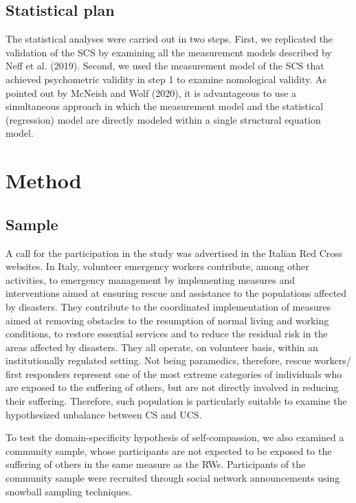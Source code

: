 \documentclass[
  man]{apa7}
\begin{document}
\hypertarget{statistical-plan}{%
\subsection{Statistical plan}\label{statistical-plan}}

The statistical analyses were carried out in two steps. First, we replicated the validation of the SCS by examining all the measurement models described by Neff et al. (2019). Second, we used the measurement model of the SCS that achieved psychometric validity in step 1 to examine nomological validity. As pointed out by McNeish and Wolf (2020), it is advantageous to use a simultaneous approach in which the measurement model and the statistical (regression) model are directly modeled within a single structural equation model.

\hypertarget{method}{%
\section{Method}\label{method}}

\hypertarget{sample}{%
\subsection{Sample}\label{sample}}

A call for the participation in the study was advertised in the Italian Red Cross websites. In Italy, volunteer emergency workers contribute, among other activities, to emergency management by implementing measures and interventions aimed at ensuring rescue and assistance to the populations affected by disasters. They contribute to the coordinated implementation of measures aimed at removing obstacles to the resumption of normal living and working conditions, to restore essential services and to reduce the residual risk in the areas affected by disasters. They all operate, on volunteer basis, within an institutionally regulated setting. Not being paramedics, therefore, rescue workers/ first responders represent one of the most extreme categories of individuals who are exposed to the suffering of others, but are not directly involved in reducing their suffering. Therefore, such population is particularly suitable to examine the hypothesized unbalance between CS and UCS.

To test the domain-specificity hypothesis of self-compassion, we also examined a community sample, whose participants are not expected to be exposed to the suffering of others in the same measure as the RWs. Participants of the community sample were recruited through social network announcements using snowball sampling techniques.
\end{document}

